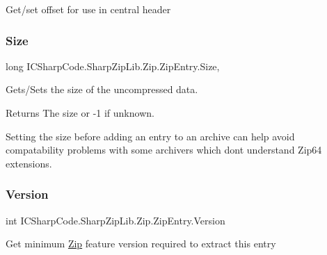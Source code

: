 Get/set offset for use in central header 

\mbox{\label{class_i_c_sharp_code_1_1_sharp_zip_lib_1_1_zip_1_1_zip_entry_a02ebed1814a50d1edc30579332ac74d3}} 
\subsubsection{\texorpdfstring{Size}{Size}}
{\footnotesize\ttfamily long I\+C\+Sharp\+Code.\+Sharp\+Zip\+Lib.\+Zip.\+Zip\+Entry.\+Size\hspace{0.3cm}{\ttfamily [get]}, {\ttfamily [set]}}



Gets/\+Sets the size of the uncompressed data. 

\begin{DoxyReturn}{Returns}
The size or -\/1 if unknown. 
\end{DoxyReturn}


Setting the size before adding an entry to an archive can help avoid compatability problems with some archivers which dont understand Zip64 extensions.\mbox{\label{class_i_c_sharp_code_1_1_sharp_zip_lib_1_1_zip_1_1_zip_entry_a307247336a78d36b538666d7581f6136}} 
\subsubsection{\texorpdfstring{Version}{Version}}
{\footnotesize\ttfamily int I\+C\+Sharp\+Code.\+Sharp\+Zip\+Lib.\+Zip.\+Zip\+Entry.\+Version\hspace{0.3cm}{\ttfamily [get]}}



Get minimum \hyperlink{namespace_i_c_sharp_code_1_1_sharp_zip_lib_1_1_zip}{Zip} feature version required to extract this entry 

